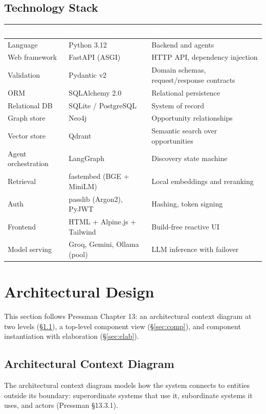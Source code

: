 \documentclass[11pt,a4paper]{article}
\begin{document}
\subsection{Technology Stack}
\begin{tabularx}{\linewidth}{|L{3.2cm}|L{4.5cm}|X|}
\hline
{}\textcolor{white}{\textbf{Layer}} & \textcolor{white}{\textbf{Technology}} & \textcolor{white}{\textbf{Role}} \\
\hline
Language & Python 3.12 & Backend and agents \\
Web framework & FastAPI (ASGI) & HTTP API, dependency injection \\
Validation & Pydantic v2 & Domain schemas, request/response contracts \\
ORM & SQLAlchemy 2.0 & Relational persistence \\
Relational DB & SQLite / PostgreSQL & System of record \\
Graph store & Neo4j & Opportunity relationships \\
Vector store & Qdrant & Semantic search over opportunities \\
Agent orchestration & LangGraph & Discovery state machine \\
Retrieval & fastembed (BGE + MiniLM) & Local embeddings and reranking \\
Auth & passlib (Argon2), PyJWT & Hashing, token signing \\
Frontend & HTML + Alpine.js + Tailwind & Build-free reactive UI \\
Model serving & Groq, Gemini, Ollama (pool) & LLM inference with failover \\
\hline
\end{tabularx}

\section{Architectural Design}
This section follows Pressman Chapter 13: an architectural context diagram at two levels
(\S\ref{sec:acd}), a top-level component view (\S\ref{sec:comp}), and component
instantiation with elaboration (\S\ref{sec:elab}).

\subsection{Architectural Context Diagram}\label{sec:acd}
The architectural context diagram models how the system connects to entities outside its
boundary: superordinate systems that use it, subordinate systems it uses, and actors
(Pressman \S13.3.1).
\end{document}
